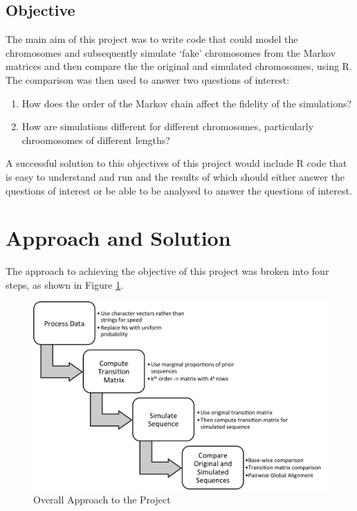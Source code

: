 \documentclass[12pt]{article}
\begin{document}
\subsection{Objective}
The main aim of this project was to write code that could model the chromosomes and subsequently simulate `fake' chromosomes from the Markov matrices and then compare the the original and simulated chromosomes, using R. The comparison was then used to answer two questions of interest:
\begin{enumerate}
\item How does the order of the Markov chain affect the fidelity of the simulations?
\item How are simulations different for different chromosomes, particularly chroomosomes of different lengths?
\end{enumerate}
A successful solution to this objectives of this project would include R code that is easy to understand and run and the results of which should either answer the questions of interest or be able to be analysed to answer the questions of interest.
\section{Approach and Solution}
The approach to achieving the objective of this project was broken into four steps, as shown in Figure \ref{fig:algorithm}.
\begin{figure}
  \centering
  \includegraphics[scale=0.5]{algorithm.png}
  \caption{Overall Approach to the Project\label{fig:algorithm}}
\end{figure}
\end{document}
